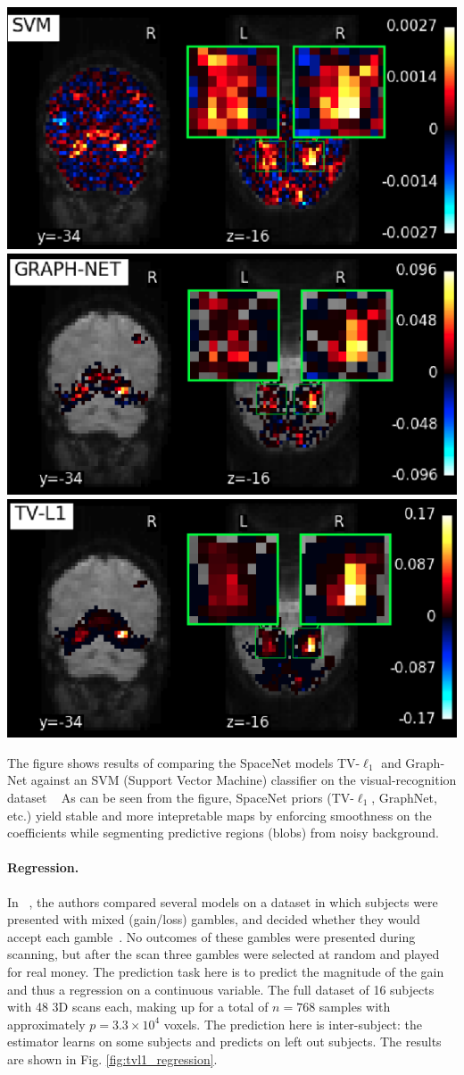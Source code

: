 \begin{pagefigure}%
  \includegraphics[width=.32\linewidth]{figures/svm.png}
  \includegraphics[width=.32\linewidth]{figures/graphnet.png}
  \includegraphics[width=.32\linewidth]{figures/tvl1.png}  
  \caption{The figure shows results of comparing the SpaceNet  models TV-$\ell_1$ and
    Graph-Net against an SVM (Support Vector Machine) classifier on
    the visual-recognition dataset  ~\citep{haxby2001}
    As can be seen from the figure, SpaceNet priors (TV-$\ell_1$, GraphNet, etc.)
    yield stable and more intepretable maps by enforcing smoothness on the coefficients while segmenting predictive regions (blobs) from noisy background.}
  \label{fig:spacenet_maps}
\end{pagefigure}

\paragraph{Regression.}
In ~\citep{gramfort2013}, the authors compared several models on a dataset in which subjects were presented with mixed (gain/loss) gambles, and decided whether they would accept each gamble~\citep{jimura2012}. No outcomes of these gambles were presented during scanning, but after the scan three gambles were selected at random and played for real money. The prediction task here is to predict the magnitude of the gain and thus a regression on a continuous variable. The full dataset of 16
subjects with 48 3D scans each, making up for a total of $n=768$ samples with approximately $p=3.3 \times 10^4$ voxels. The prediction here is inter-subject: the estimator
learns on some subjects and predicts on left out subjects.
The results are shown in Fig. \ref{fig:tvl1_regression}.

